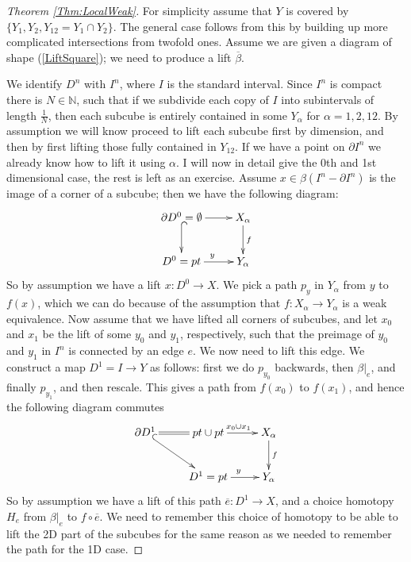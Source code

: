\documentclass{article}
\newtheorem{proposed work}[theorem]{Proposed Work}
\newcommand{\xymat}[1]{\begin{align*}\xymatrix{ #1}\end{align*}}
\begin{document}
\begin{proof}[Theorem \ref{Thm:LocalWeak}]
For simplicity assume that $Y$ is covered by $\{Y_1,Y_2,Y_{12}=Y_1\cap Y_2\}$. The general case follows from this by building up more complicated intersections from twofold ones. Assume we are given a diagram of shape (\ref{LiftSquare}); we need to produce a lift $\overline{\beta}$. 

We identify $D^n$ with $I^n$, where $I$ is the standard interval. Since $I^n$ is compact there is $N\in \mathbb{N}$, such that if we subdivide each copy of $I$ into subintervals of length $\frac{1}{N}$, then each subcube is entirely contained in some $Y_\alpha$ for $\alpha=1,2,12$. By assumption we will know proceed to lift each subcube first by dimension, and then by first lifting those fully contained in $Y_{12}$. If we have a point on $\partial I^n$ we already know how to lift it using $\alpha$. I will now in detail give the 0th and 1st dimensional case, the rest is left as an exercise. Assume $x\in \beta(I^n-\partial I^n)$ is the image of a corner of a subcube; then we have the following diagram:
\xymat{\partial D^0 =\emptyset \ar[r] \ar@{^{(}->}[d] & X_\alpha \ar[d]^f \\ D^0=pt \ar[r]^y & Y_\alpha }
So by assumption we have a lift $x:D^0 \to X$. We pick a path $p_y$ in $Y_\alpha$ from  $y$ to $f(x)$, which we can do because of the assumption that $f:X_\alpha \to Y_\alpha$ is a weak equivalence. Now assume that we have lifted all corners of subcubes, and let $x_0$ and $x_1$ be the lift of some $y_0$ and $y_1$, respectively, such that the preimage of $y_0$ and $y_1$ in $I^n$ is connected by an edge $e$. We now need to lift this edge. We construct a map $D^1=I \to Y$ as follows: first we do $p_{y_0}$ backwards, then $\beta|_e$, and finally $p_{y_1}$, and then rescale. This gives a path from $f(x_0)$ to $f(x_1)$, and hence the following diagram commutes
\xymat{\partial D^1 \ar@{=}[r]\ar@{^{(}->}[dr]& pt \cup pt \ar[r]^{x_0 \cup x_1}  & X_\alpha \ar[d]^f \\ & D^1=pt \ar[r]^y & Y_\alpha}
So by assumption we have a lift of this path $\overline{e}: D^1\to X$, and a choice homotopy $H_e$ from $\beta|_e$ to $f\circ \overline{e}$. We need to remember this choice of homotopy to be able to lift the 2D part of the subcubes for the same reason as we needed to remember the path for the 1D case.
\end{proof}
\end{document}
